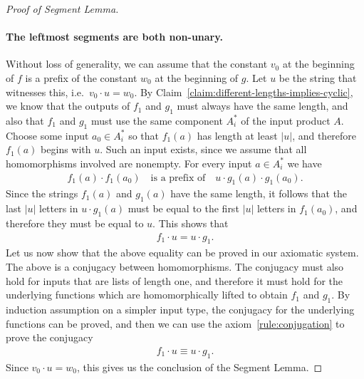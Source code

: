 \begin{proof}[Proof of Segment Lemma]
\paragraph*{The leftmost segments are both non-unary.}  Without loss of generality, we can assume that the constant $v_0$ at the beginning of $f$ is a prefix of the constant $w_0$ at the beginning of $g$. Let $u$ be the string that witnesses this, i.e.~$v_0 \cdot u = w_0$. By Claim~\ref{claim:different-lengths-implies-cyclic}, we know that the outputs of $f_1$ and $g_1$ must always have the same length, and also that $f_1$ and $g_1$ must use the same component $A^*_i$ of the input product $A$.
        Choose some input $a_0 \in A_i^*$ so that $f_1(a)$ has length at least $|u|$, and therefore $f_1(a)$ begins with $u$. Such an input exists, since we assume that all homomorphisms involved are nonempty. For every input $a \in A_i^*$ we have 
    \begin{align*}
    f_1(a) \cdot f_1(a_0)  \quad \text{is a prefix of} \quad
    u \cdot g_1(a) \cdot g_1(a_0).
    \end{align*}
    Since the strings $f_1(a)$ and $g_1(a)$ have the same length, it follows that  the last $|u|$ letters in $u \cdot g_1(a)$ must be equal to the first $|u|$ letters in $f_1(a_0)$, and therefore they must be equal to $u$. This shows that 
\begin{align*}
    f_1 \cdot u = u \cdot g_1.
\end{align*}
Let us now show that the above equality can be proved in our axiomatic system.
The above is a conjugacy between homomorphisms.
The conjugacy must also hold for inputs that are lists of length one, and therefore it must hold for the underlying functions which are homomorphically lifted to obtain $f_1$ and $g_1$. By induction assumption on a simpler input type, the conjugacy for the underlying functions can be proved, and then we can use the axiom~\eqref{rule:conjugation} to prove the  conjugacy 
\begin{align*}
    f_1 \cdot u \equiv u \cdot g_1.
\end{align*}
Since $v_0 \cdot u = w_0$, this gives us the conclusion of the Segment Lemma.

\end{proof}